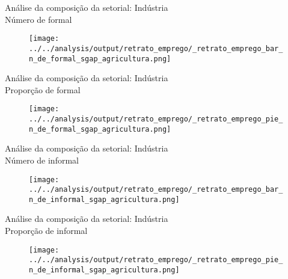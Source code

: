 \begin{frame}[label=_retrato_emprego_bar_n_de_formal_sgap_agricultura]{{\small Análise da composição da setorial: Indústria \\  Número de formal}}
\textit{\hyperlink{_retrato_emprego_sgap_agricultura}{}}
\begin{figure}
  \centering
  \texttt{[image: ../../analysis/output/retrato\_emprego/\_retrato\_emprego\_bar\_n\_de\_formal\_sgap\_agricultura.png]}
  \caption{}
  \label{fig:_retrato_emprego_bar_n_de_formal_sgap_agricultura}
\end{figure}
\end{frame}



\begin{frame}[label=_retrato_emprego_pie_n_de_formal_sgap_agricultura]{{\small Análise da composição da setorial: Indústria \\  Proporção de formal}}
\textit{\hyperlink{_retrato_emprego_sgap_agricultura}{}}
\begin{figure}
  \centering
  \texttt{[image: ../../analysis/output/retrato\_emprego/\_retrato\_emprego\_pie\_n\_de\_formal\_sgap\_agricultura.png]}
  \caption{}
  \label{fig:_retrato_emprego_pie_n_de_formal_sgap_agricultura}
\end{figure}
\end{frame}


\begin{frame}[label=_retrato_emprego_bar_n_de_informal_sgap_agricultura]{{\small Análise da composição da setorial: Indústria \\  Número de informal}}
\textit{\hyperlink{_retrato_emprego_sgap_agricultura}{}}
\begin{figure}
  \centering
  \texttt{[image: ../../analysis/output/retrato\_emprego/\_retrato\_emprego\_bar\_n\_de\_informal\_sgap\_agricultura.png]}
  \caption{}
  \label{fig:_retrato_emprego_bar_n_de_informal_sgap_agricultura}
\end{figure}
\end{frame}


\begin{frame}[label=_retrato_emprego_pie_n_de_informal_sgap_agricultura]{{\small Análise da composição da setorial: Indústria \\  Proporção de informal}}
\textit{\hyperlink{_retrato_emprego_sgap_agricultura}{}}
\begin{figure}
  \centering
  \texttt{[image: ../../analysis/output/retrato\_emprego/\_retrato\_emprego\_pie\_n\_de\_informal\_sgap\_agricultura.png]}
  \caption{}
  \label{fig:_retrato_emprego_pie_n_de_informal_sgap_agricultura}
\end{figure}
\end{frame}

